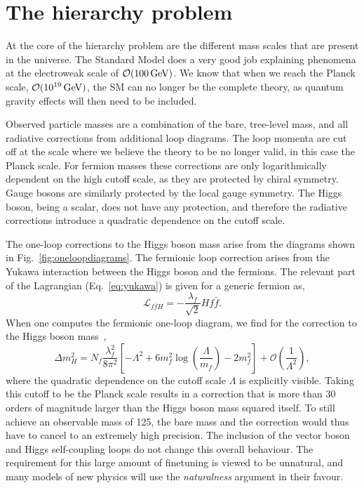 \section{The hierarchy problem \label{sec:hierarchy_problem}}

At the core of the hierarchy problem are the different mass scales that are present in the
universe. The Standard Model does a very good job explaining phenomena at the electroweak scale of
$\mathcal{O}(100\,\text{Ge\hspace{-.08em}V})$. We know that when we reach the Planck scale,
$\mathcal{O}(\text{10}^{\text{19}}\,\text{Ge\hspace{-.08em}V})$, the SM can no longer be the complete theory, as 
quantum gravity effects will then need to be included. 

Observed particle masses are a combination of the bare, tree-level mass, and all radiative
corrections from additional loop diagrams. The loop momenta are cut off at the scale where we
believe the theory to be no longer valid, in this case the Planck scale. 
For fermion masses these corrections are only logarithmically dependent on the high cutoff scale,
as they are protected by chiral symmetry. Gauge bosons are similarly protected by the local gauge 
symmetry. The Higgs boson, being a scalar, does not have any protection, and therefore the
radiative corrections introduce a quadratic dependence on the cutoff scale. 

The one-loop corrections to the Higgs boson mass arise from the diagrams shown in
Fig.~\ref{fig:oneloopdiagrams}. The fermionic loop correction arises from the Yukawa interaction
between the Higgs boson and the fermions. The relevant part of the Lagrangian (Eq.~\ref{eq:yukawa})
is given for a generic fermion as,
\begin{equation}
  \mathcal{L}_{f\bar{f}H} = - \frac{\lambda_f}{\sqrt{2}} H f \bar{f} .
\end{equation}
When one computes the fermionic one-loop diagram, we find for the correction to the Higgs boson
mass~\cite{Djouadi:2005gj}, 
\begin{equation}
  \Delta m_H^2 = N_f \frac{\lambda_f^2}{8\pi^2} \left[ - \Lambda^2 + 6 m_f^2 \log
\left(\frac{\Lambda}{m_f}\right) - 2 m_f^2 \right] + \mathcal{O}\left(\frac{1}{\Lambda^2}\right) ,
\end{equation}
where the quadratic dependence on the cutoff scale $\Lambda$ is explicitly visible. Taking this
cutoff to be the Planck scale results in a correction that is more than 30 orders of magnitude
larger than the Higgs boson mass squared itself. To still achieve an observable mass of 125\GeV, the
bare mass and the correction would thus have to cancel to an extremely high precision. The inclusion
of the vector boson and Higgs self-coupling loops do not change this overall behaviour. 
The requirement for this large amount of finetuning is viewed to be unnatural, and many models of
new physics will use the \textit{naturalness} argument in their favour. 

